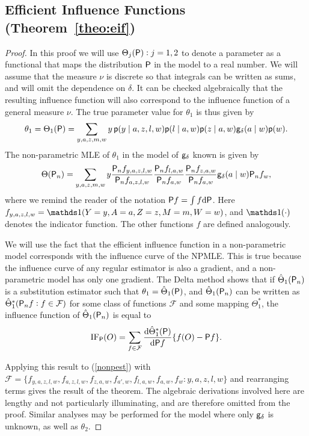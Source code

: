 \subsection{Efficient Influence Functions (Theorem~\ref{theo:eif})}
\begin{proof}
  In this proof we will use $\Theta_j(\P):j=1,2$ to denote a parameter
  as a functional that maps the distribution $\P$ in the model to a
  real number. We will assume that the measure $\nu$ is discrete so
  that integrals can be written as sums, and will omit the dependence
  on $\delta$. It can be checked algebraically that the resulting
  influence function will also correspond to the influence function of
  a general measure $\nu$. The true parameter value for $\theta_1$ is
  thus given by
  \[\theta_1=\Theta_1(\P) = \sum_{y,a,z,m,w} y\,\p(y\mid a, z, l,
    w)\p(l\mid a,w)\p(z\mid a,w)\g_\delta(a\mid w)\p(w).\] The
  non-parametric MLE of $\theta_1$ in the model of $\g_\delta$ known
  is given by
  \begin{equation}
    \Theta(\Pn)=\sum_{y,a,z,m,w}y\frac{\Pn f_{y,a,z,l,w}}{\Pn
      f_{a,z,l,w}}\frac{\Pn f_{l,a,w}}{\Pn f_{a,w}}\frac{\Pn
      f_{z,a,w}}{\Pn f_{a,w}}\g_{\delta}(a\mid w)\Pn f_w\label{nonpest},
  \end{equation}
  where we remind the reader of the notation $\P f =\int f \dd\P$. Here
  $f_{y,a,z,l,w}=\one(Y=y,A=a,Z=z,M=m,W=w)$, and $\one(\cdot)$ denotes
  the indicator function. The other functions $f$ are defined
  analogously.

  We will use the fact that the efficient influence function in a
  non-parametric model corresponds with the influence curve of the
  NPMLE. This is true because the influence curve of any regular
  estimator is also a gradient, and a non-parametric model has only
  one gradient. The Delta method \cite[see, e.g., Appendix 18
  of][]{vdl2011targeted} shows that if $\hat \Theta_1(\Pn)$ is a
  substitution estimator such that $\theta_1=\hat \Theta_1(\P)$, and
  $\hat \Theta_1(\Pn)$ can be written as
  $\hat \Theta^*_1(\Pn f:f\in\mathcal{F})$ for some class of functions
  $\mathcal{F}$ and some mapping $\Theta^*_1$, the influence function of
  $\hat \Theta_1(\Pn)$ is equal to
  \[\dr_\P(O)=\sum_{f\in\mathcal{F}}\frac{\dd\hat \Theta^*_1(\P)}
  {\dd\P f}\{f(O)-\P f\}.\]

  Applying this result to (\ref{nonpest}) with
  $\mathcal{F}=\{f_{y,a,z,l,w},f_{a,z,l,w},f_{z,a,w},f_{a',w},
  f_{l,a,w},f_{a,w},f_w:y,a,z,l,w\}$ and rearranging terms gives the result of
  the theorem. The algebraic derivations involved here are lengthy and not
  particularly illuminating, and are therefore omitted from the proof. Similar
  analyses may be performed for the model where only $\g_\delta$ is unknown, as
  well as $\theta_2$.
\end{proof}

